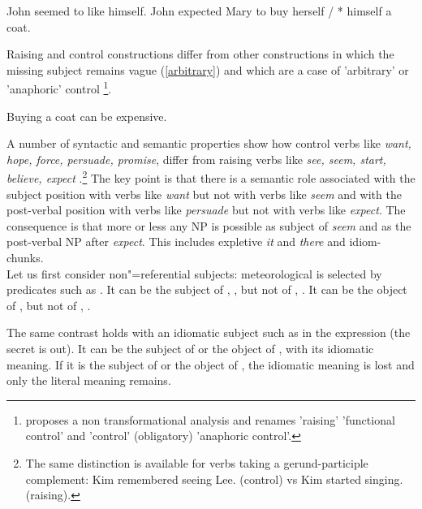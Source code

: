\documentclass[output=paper
	        ,collection
	        ,collectionchapter
 	        ,biblatex
                ,babelshorthands
                ,newtxmath
                ,draftmode
                ,colorlinks, citecolor=brown
]{langscibook}
\begin{document}
\begin{exe}
	\ex \begin{xlist}
	\ex John seemed to like himself.\label{seem}
\ex  John expected Mary to buy herself / * himself a coat. \label{exp}
\end{xlist}
 \end{exe}
 
 Raising and control constructions differ from other constructions in which the missing subject
 remains vague (\ref{arbitrary}) and which are a case of 'arbitrary' or 'anaphoric' control
 \parencites{Chomsky1981}[]{Bresnan82c}\footnote{\citet{Bresnan82c} proposes a non transformational analysis and renames 'raising' 'functional control' and 'control' (obligatory) 'anaphoric control'.}.
 
\begin{exe}
 \ex Buying a coat can be expensive.\label{arbitrary}
  \end{exe}
  
 A number of syntactic and semantic properties show how control verbs like \emph{want, hope, force, persuade, promise}, differ from raising verbs like \emph{see, seem, start, believe, expect} \citep{Rosenbaum67a-u,Postal1974,Bresnan82c}.\footnote{The same distinction is available for verbs taking a gerund-participle complement:
Kim remembered seeing Lee. (control) vs  Kim started singing. (raising).}
 The key point is that there is a semantic role associated with the subject position with verbs like \emph{want} but not with verbs like \emph{seem} and with the post-verbal position with verbs like \emph{persuade} but not with verbs like \emph{expect}.  The consequence is that more or less any NP is possible as subject of \emph{seem} and as the post-verbal NP after \emph{expect}. This includes expletive \emph{it} and \emph{there} and idiom-chunks. \\
 Let us first consider non"=referential subjects: meteorological  is selected
 by predicates such as . It can be the subject of , , but not of
 , . It can be the object of ,  but not of , .
	
\eal
{}
 \label{rain1}
 \label{rain2}
\zl
\eal
{} \label{rain3}
 \label{rain4}
\zl
 	
 The same contrast holds with an idiomatic subject such as  in the expression  (the secret is out). It can be the subject of  or the object of , with its idiomatic meaning. If it is the subject of  or the object of , the idiomatic meaning is lost and only the literal meaning remains.
 
\end{document}

